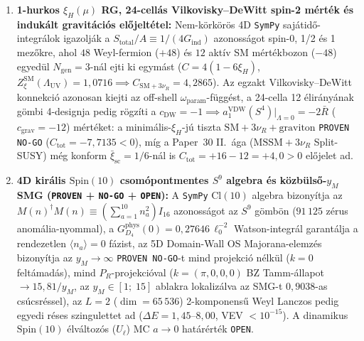 \documentclass[11pt,a4paper]{article}
\begin{document}
\begin{enumerate}
\item \textbf{1-hurkos $\xi_H(\mu)$ RG, 24-cellás Vilkovisky--DeWitt spin-2 mérték és indukált gravitációs előjeltétel:} Nem-körkörös 4D \texttt{SymPy} sajátidő-integrálok igazolják a $S_{\mathrm{total}}/A \equiv 1/(4G_{\mathrm{ind}})$ azonosságot spin-0, 1/2 és 1 mezőkre, ahol $48$ Weyl-fermion ($+48$) és $12$ aktív SM mértékbozon ($-48$) egyedül $N_{\mathrm{gen}}=3$-nál ejti ki egymást ($C=4(1-6\xi_H)$, $Z_\xi^{\mathrm{SM}}(\Lambda_{\mathrm{UV}})=1{,}0716\implies C_{\mathrm{SM}+3\nu_R}=4{,}2865$). Az egzakt Vilkovisky--DeWitt konnekció azonosan kiejti az off-shell $\omega_{\mathrm{param}}$-függést, a 24-cella 12 élirányának gömbi 4-designja pedig rögzíti a $c_{\mathrm{DW}}=-1\implies a_1^{\mathrm{VDW}}(S^4)|_{\Lambda=0}=-2\bar R$ ($c_{\mathrm{grav}}=-12$) mértéket: a minimális-$\xi_H$-jú tiszta $\mathrm{SM}+3\nu_R+\text{graviton}$ \texttt{PROVEN NO-GO} ($C_{\mathrm{tot}}=-7{,}7135<0$), míg a Paper~30 II.~ága ($\mathrm{MSSM}+3\nu_R$ Split-SUSY) még konform $\bar\xi_{\mathrm{sc}}=1/6$-nál is $C_{\mathrm{tot}}=+16-12=+4{,}0>0$ előjelet ad.
\item \textbf{4D királis $\mathrm{Spin}(10)$ csomópontmentes $S^9$ algebra és közbülső-$y_M$ SMG (\texttt{PROVEN} + \texttt{NO-GO} + \texttt{OPEN}):} A \texttt{SymPy} $\mathrm{Cl}(10)$ algebra bizonyítja az $M(n)^\dagger M(n)\equiv (\sum_{a=1}^{10} n_a^2)I_{16}$ azonosságot az $S^9$ gömbön ($91\,125$ zérus anomália-nyommal), a $G_{D_4}^{\mathrm{phys}}(0)=0{,}27646\,\ell_0^{-2}$ Watson-integrál garantálja a rendezetlen $\langle n_a\rangle=0$ fázist, az 5D Domain-Wall OS Majorana-elemzés bizonyítja az $y_M\to\infty$ \texttt{PROVEN NO-GO}-t mind projekció nélkül ($k=0$ feltámadás), mind $P_R$-projekcióval ($k=(\pi,0,0,0)$ BZ Tamm-állapot $\to 15{,}81/y_M$, az $y_M\in[1;\; 15]$ ablakra lokalizálva az SMG-t $0{,}9038$-as csúcsréssel), az $L=2$ ($\dim=65\,536$) 2-komponensű Weyl Lanczos pedig egyedi réses szingulettet ad ($\Delta E=1{,}45\text{--}8{,}00$, VEV $<10^{-15}$). A dinamikus $\mathrm{Spin}(10)$ élváltozós ($U_\ell$) MC $a\to 0$ határérték \texttt{OPEN}.
\end{enumerate}
\end{document}
